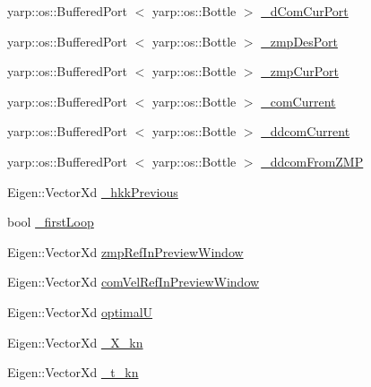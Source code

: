 \begin{DoxyCompactItemize}
\item 
yarp\-::os\-::\-Buffered\-Port\*
$<$ yarp\-::os\-::\-Bottle $>$ \hyperlink{classWalkingClient_a1fbc9d7f1e967f24acda745028f865df}{\-\_\-d\-Com\-Cur\-Port}
\item 
yarp\-::os\-::\-Buffered\-Port\*
$<$ yarp\-::os\-::\-Bottle $>$ \hyperlink{classWalkingClient_acbac3e142471448b50dd605e4217b0d0}{\-\_\-zmp\-Des\-Port}
\item 
yarp\-::os\-::\-Buffered\-Port\*
$<$ yarp\-::os\-::\-Bottle $>$ \hyperlink{classWalkingClient_a546e6830e43d19ba7d8a8e808e28ef53}{\-\_\-zmp\-Cur\-Port}
\item 
yarp\-::os\-::\-Buffered\-Port\*
$<$ yarp\-::os\-::\-Bottle $>$ \hyperlink{classWalkingClient_a199a104e0d4d52deae07d88d8229b60d}{\-\_\-com\-Current}
\item 
yarp\-::os\-::\-Buffered\-Port\*
$<$ yarp\-::os\-::\-Bottle $>$ \hyperlink{classWalkingClient_a692d95b3e76a396d107b0c29a3d591f1}{\-\_\-ddcom\-Current}
\item 
yarp\-::os\-::\-Buffered\-Port\*
$<$ yarp\-::os\-::\-Bottle $>$ \hyperlink{classWalkingClient_a41b7320607812418af496b8b2c30204f}{\-\_\-ddcom\-From\-Z\-M\-P}
\item 
\-Eigen\-::\-Vector\-Xd \hyperlink{classWalkingClient_a3797b54c4f53a2a5c36fe34ef4ce24aa}{\-\_\-hkk\-Previous}
\item 
bool \hyperlink{classWalkingClient_ab645ecb2d55e28b57a64ca48ee638b1e}{\-\_\-first\-Loop}
\item 
\-Eigen\-::\-Vector\-Xd \hyperlink{classWalkingClient_af28b3cd3b1202f83e193b098572fbdd3}{zmp\-Ref\-In\-Preview\-Window}
\item 
\-Eigen\-::\-Vector\-Xd \hyperlink{classWalkingClient_ab3b1defedb6d79b5b6eaadd52bbad9f5}{com\-Vel\-Ref\-In\-Preview\-Window}
\item 
\-Eigen\-::\-Vector\-Xd \hyperlink{classWalkingClient_a0e5aee88e377029d79f57e778c583f18}{optimal\-U}
\item 
\-Eigen\-::\-Vector\-Xd \hyperlink{classWalkingClient_ab56a64a3f08320bb1b92671c6612f7b9}{\-\_\-\-X\-\_\-kn}
\item 
\-Eigen\-::\-Vector\-Xd \hyperlink{classWalkingClient_a6f3b88aea634bc46550593df837e6610}{\-\_\-t\-\_\-kn}
\end{DoxyCompactItemize}


